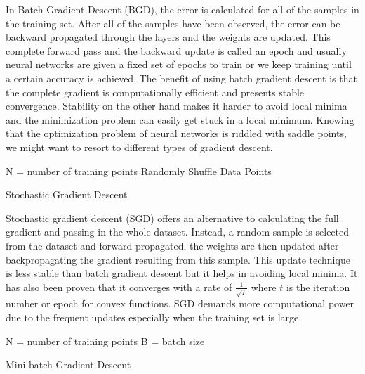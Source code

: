 In Batch Gradient Descent (BGD), the error is calculated for all of the samples in the training set. After all of the samples have been observed, the error can be backward propagated through the layers and the weights are updated. This complete forward pass and the backward update is called an epoch and usually neural networks are given a fixed set of epochs to train or we keep training until a certain accuracy is achieved. The benefit of using batch gradient descent is that the complete gradient is computationally efficient and presents stable convergence. Stability on the other hand makes it harder to avoid local minima and the minimization problem can easily get stuck in a local minimum. Knowing that the optimization problem of neural networks is riddled with saddle points, we might want to resort to different types of gradient descent. 

\begin{minipage}{.7\linewidth}
\begin{algorithm}[H]
N = number of training points\;
Randomly Shuffle Data Points\;
 \caption{Stochastic Gradient Descent}
\end{algorithm}
\end{minipage}

Stochastic gradient descent (SGD) offers an alternative to calculating the full gradient and passing in the whole dataset. Instead, a random sample is selected from the dataset and forward propagated, the weights are then updated after backpropagating the gradient resulting from this sample. This update technique is less stable than batch gradient descent but it helps in avoiding local minima. It has also been proven that it converges with a rate of  $ \frac{1}{\sqrt{T}}  $ where $ \mathit{t} $ is the iteration number or epoch  for convex functions. SGD demands more computational power due to the frequent updates especially when the training set is large.


\begin{minipage}{.7\linewidth}
\begin{algorithm}[H]
N = number of training points\;
B = batch size\;
 \caption{Mini-batch Gradient Descent}
\end{algorithm}
\end{minipage}

